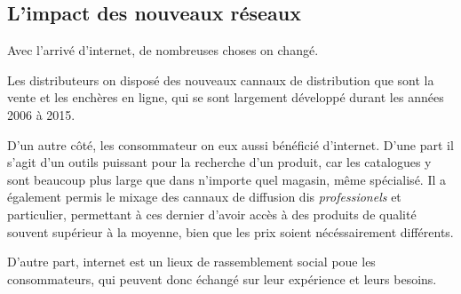 \subsection{L'impact des nouveaux réseaux}

Avec l'arrivé d'internet, de nombreuses choses on changé.

\medbreak
Les distributeurs on disposé des nouveaux cannaux de distribution que sont la vente et les enchères en ligne, qui se sont largement développé durant les années 2006 à 2015.

\medbreak
D'un autre côté, les consommateur on eux aussi bénéficié d'internet.
\smallbreak
D'une part il s'agit d'un outils puissant pour la recherche d'un produit, car les catalogues y sont beaucoup plus large que dans n'importe quel magasin, même spécialisé. Il a également permis le mixage des cannaux de diffusion dis \textit{professionels} et {particulier}, permettant à ces dernier d'avoir accès à des produits de qualité souvent supérieur à la moyenne, bien que les prix soient nécéssairement différents.

D'autre part, internet est un lieux de rassemblement social poue les consommateurs, qui peuvent donc échangé sur leur expérience et leurs besoins.